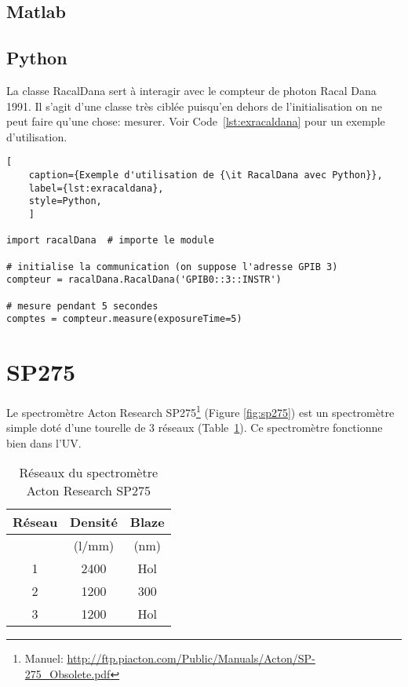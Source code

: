 \documentclass[11pt,francais]{book} %
\begin{document}
\subsection{Matlab}

\subsection{Python}

La classe RacalDana sert à interagir avec le compteur de photon Racal Dana 1991.
Il s'agit d'une classe très ciblée puisqu'en dehors de l'initialisation on ne peut faire qu'une chose: mesurer.
Voir Code~\ref{lst:exracaldana} pour un exemple d'utilisation.

\begin{lstlisting}[
    caption={Exemple d'utilisation de {\it RacalDana avec Python}},
    label={lst:exracaldana},
    style=Python,
    ]  
 
import racalDana  # importe le module

# initialise la communication (on suppose l'adresse GPIB 3)
compteur = racalDana.RacalDana('GPIB0::3::INSTR') 

# mesure pendant 5 secondes
comptes = compteur.measure(exposureTime=5)
\end{lstlisting}


\section{SP275}

Le spectromètre Acton Research SP275\footnote{Manuel: \url{http://ftp.piacton.com/Public/Manuals/Acton/SP-275_Obsolete.pdf}} (Figure \ref{fig:sp275}) est un spectromètre simple doté d'une tourelle de 3 réseaux (Table~\ref{table:reseauxSP275}).
Ce spectromètre fonctionne bien dans l'UV.

\begin{table}[htbp]
  \caption{Réseaux du spectromètre Acton Research SP275}
  \label{table:reseauxSP275}
  \centering
    \begin{tabular}{ccc}
    Réseau & Densité    & Blaze \\ \hline
    ~      & (l/mm)     & (nm)  \\
    1      & 2400       & Hol     \\
    2      & 1200       & 300     \\
    3      & 1200       & Hol     \\
    \end{tabular}
\end{table}
\end{document}
